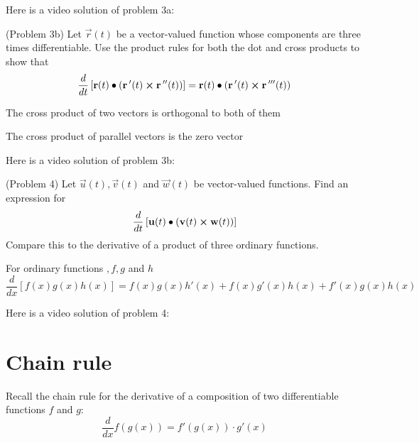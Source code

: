 \documentclass[handout]{ximera}
\begin{document}
Here is a video solution of problem 3a:\\
\begin{foldable}
\end{foldable}

\begin{problem}(Problem 3b)
Let $\vec r(t)$ be a vector-valued function whose components are three times differentiable. Use the product rules for both the dot and cross products to show that
\[
\frac{d}{dt}\left[\mathbf r(t) \bullet \left(\mathbf r\,'(t) \boldsymbol\times \mathbf r\,''(t)\right)\right] = \mathbf r(t) \bullet \left(\mathbf r\,'(t) \boldsymbol\times \mathbf r\,'''(t)\right)
\]
\begin{hint}
The cross product of two vectors is orthogonal to both of them
\end{hint}
\begin{hint}
The cross product of parallel vectors is the zero vector
\end{hint}
\end{problem}

Here is a video solution of problem 3b:\\
\begin{foldable}
\end{foldable}

\begin{problem}(Problem 4)
Let $\vec u(t), \vec v(t)$ and $\vec w(t)$ be vector-valued functions. Find an expression for
\[
\frac{d}{dt}\left[ \mathbf u(t) \bullet \left(\mathbf v(t) \boldsymbol\times \mathbf w(t)\right)\right]
\]
Compare this to the derivative of a product of three ordinary functions.
\begin{hint}
For ordinary functions $,f, g$ and $h$
\[
\frac{d}{dx}\left[f(x)g(x)h(x)\right] = f(x)g(x)h'(x) + f(x)g'(x)h(x) + f'(x)g(x)h(x)
\]
\end{hint}
\end{problem}

Here is a video solution of problem 4:\\
\begin{foldable}
\end{foldable}

\section{Chain rule}
Recall the chain rule for the derivative of a composition of two differentiable functions $f$ and $g$:
\[
\frac{d}{dx} f(g(x)) = f'(g(x)) \cdot g'(x)
\]
\end{document}
